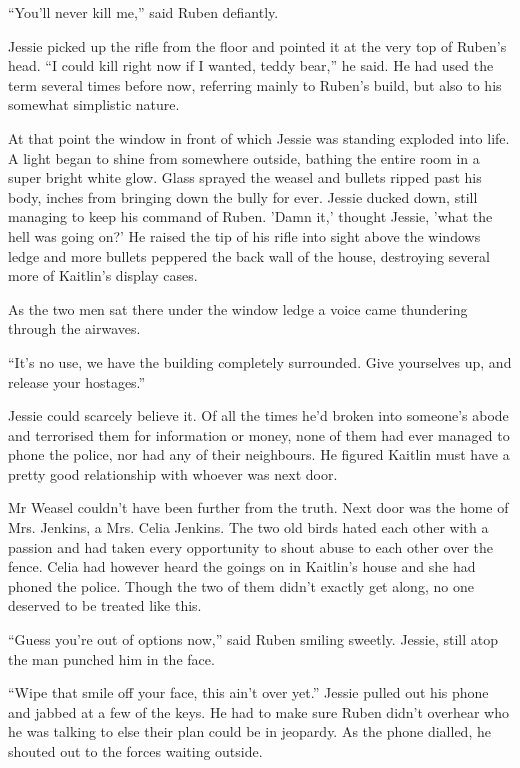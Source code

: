 ``You'll never kill me,'' said Ruben defiantly.  

Jessie picked up the rifle from the floor and pointed it at the very top of Ruben's head.  ``I could kill right now if I wanted, teddy bear,'' he said.  He had used the term several times before now, referring mainly to Ruben's build, but also to his somewhat simplistic nature.

At that point the window in front of which Jessie was standing exploded into life.  A light began to shine from somewhere outside, bathing the entire room in a super bright white glow.  Glass sprayed the weasel and bullets ripped past his body, inches from bringing down the bully for ever.  Jessie ducked down, still managing to keep his command of Ruben.  'Damn it,' thought Jessie, 'what the hell was going on?'  He raised the tip of his rifle into sight above the windows ledge and more bullets peppered the back wall of the house, destroying several more of Kaitlin's display cases.  

As the two men sat there under the window ledge a voice came thundering through the airwaves.

``It's no use, we have the building completely surrounded.  Give yourselves up, and release your hostages.''

Jessie could scarcely believe it.  Of all the times he'd broken into someone's abode and terrorised them for information or money, none of them had ever managed to phone the police, nor had any of their neighbours.  He figured Kaitlin must have a pretty good relationship with whoever was next door.  

Mr Weasel couldn't have been further from the truth.  Next door was the home of Mrs. Jenkins, a Mrs. Celia Jenkins.  The two old birds hated each other with a passion and had taken every opportunity to shout abuse to each other over the fence.  Celia had however heard the goings on in Kaitlin's house and she had phoned the police.  Though the two of them didn't exactly get along, no one deserved to be treated like this.

``Guess you're out of options now,'' said Ruben smiling sweetly.  Jessie, still atop the man punched him in the face.

``Wipe that smile off your face, this ain't over yet.''  Jessie pulled out his phone and jabbed at a few of the keys.  He had to make sure Ruben didn't overhear who he was talking to else their plan could be in jeopardy.  As the phone dialled, he shouted out to the forces waiting outside.

